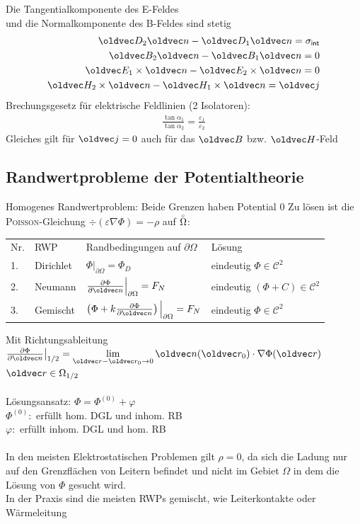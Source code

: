 \documentclass[6pt,a4paper]{scrartcl}
\let\vec\oldvec
\begin{document}
\begin{multicols}{4}
{	Die Tangentialkomponente des E-Feldes\\ und die Normalkomponente des B-Feldes sind stetig
	\begin{eqnarray*}
	\vec D_2 \vec n - \vec D_1 \vec n = \sigma_{\ir int} \\
			\vec B_2 \vec n - \vec B_1 \vec n = 0 \\
			\vec E_1 \times \vec n - \vec E_2 \times \vec n = 0 \\
			\vec H_2 \times \vec n - \vec H_1 \times \vec n = \vec j
	\end{eqnarray*}
	Brechungsgesetz für elektrische Feldlinien (2 Isolatoren): \\
	\begin{eqnarray*}
		\frac{\tan \alpha_1}{\tan \alpha_2} = \frac{\varepsilon_1}{\varepsilon_2}
	\end{eqnarray*}
	Gleiches gilt für $\vec j = 0$ auch für das $\vec B$ bzw. $\vec H$-Feld
	}
	
	\subsection{Randwertprobleme der Potentialtheorie}
	Homogenes Randwertproblem: Beide Grenzen haben Potential 0
	Zu lösen ist die \textsc{Poisson}-Gleichung $\div(\varepsilon \nabla \Phi) = -\rho$ auf $\overset{{}_\circ}{\Omega}$:\\
	\begin{tabular*}{\columnwidth}{@{\extracolsep\fill}llll@{}}
	Nr. & RWP & Randbedingungen auf $\partial \Omega$ & Lösung\\
	1. & Dirichlet & $\Phi\big|_{\partial\Omega} = \Phi_D$ & eindeutig $\Phi \in \mathcal C^2$\\[0.5em]
	2. & Neumann & $\frac{\partial \Phi}{\partial \vec n}\Big|_{\partial\Omega} = F_N$ & eindeutig $(\Phi + C) \in \mathcal C^2$\\[0.5em]
	3. & Gemischt & $\left( \Phi + k \frac{\partial \Phi}{\partial \vec n}\right)\Big|_{\partial\Omega} = F_N$ & eindeutig $\Phi \in \mathcal C^2$\\
	\end{tabular*} 
	Mit Richtungsableitung $\frac{\partial \Phi}{\partial \vec n}\big|_{1/2} = \lim\limits_{\vec r - \vec r_0 \ra 0} \vec n(\vec r_0) \cdot \nabla\Phi(\vec r)$ \quad $\vec r \in \Omega_{1/2}$\\
	\\
	Lösungsansatz: $\Phi = \Phi^{(0)} + \varphi$\\
	$\Phi^{(0)}:$ erfüllt hom. DGL und inhom. RB\\
	$\varphi:$ erfüllt inhom. DGL und hom. RB\\
	\\
	In den meisten Elektrostatischen Problemen gilt $\rho = 0$, da sich die Ladung nur auf den Grenzflächen von Leitern befindet und nicht im Gebiet $\Omega$ in dem die Lösung von $\Phi$ gesucht wird.\\
	In der Praxis sind die meisten RWPs gemischt, wie Leiterkontakte oder Wärmeleitung\\ 
	

\end{multicols}
\end{document}
